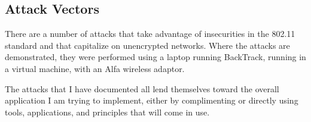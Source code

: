 \clearpage
\subsection{Attack Vectors}
\label{sec:attacks}
There are a number of attacks that take advantage of insecurities in the 802.11 standard and that capitalize on unencrypted networks.  Where the attacks are demonstrated, they were performed using a laptop running BackTrack, running in a virtual machine, with an Alfa wireless adaptor.

The attacks that I have documented all lend themselves toward the overall application I am trying to implement, either by complimenting or directly using tools, applications, and principles that will come in use.





